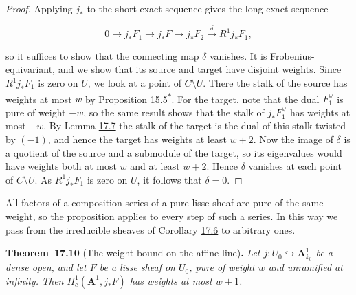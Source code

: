 \documentclass[11pt]{article}
\newenvironment{bpstatement}[2]{\par\addvspace{0.6\baselineskip}\noindent\textbf{#1}#2\textbf{.}\enspace\ignorespaces}
  {\par\addvspace{0.4\baselineskip}}
\newenvironment{bpstatementit}[2]{\begin{bpstatement}{#1}{#2}\itshape\ignorespaces}{\end{bpstatement}}
\newcommand{\bpout}[1]{#1\textsuperscript{\hyperlink{bp-outside}{\ensuremath{\ast}}}}
\begin{document}
\begin{proof}[{Proof}]\label{bp28}%
Applying \(j_*\) to the short exact sequence gives the long exact sequence

\[
0\to j_*F_1\to j_*F\to j_*F_2\xrightarrow{\ \delta\ }R^1j_*F_1,
\]

so it suffices to show that the connecting map \(\delta\) vanishes. It is Frobenius-equivariant, and we show that its source and target have disjoint weights. Since \(R^1j_*F_1\) is zero on \(U\), we look at a point of \(C\setminus U\). There the stalk of the source has weights at most \(w\) by Proposition \bpout{15.5}. For the target, note that the dual \(F_1^\vee\) is pure of weight \(-w\), so the same result shows that the stalk of \(j_*F_1^\vee\) has weights at most \(-w\). By Lemma \hyperref[bp23]{17.7} the stalk of the target is the dual of this stalk twisted by \((-1)\), and hence the target has weights at least \(w+2\). Now the image of \(\delta\) is a quotient of the source and a submodule of the target, so its eigenvalues would have weights both at most \(w\) and at least \(w+2\). Hence \(\delta\) vanishes at each point of \(C\setminus U\). As \(R^1j_*F_1\) is zero on \(U\), it follows that \(\delta=0\).
\end{proof}

\label{bp29}%
All factors of a composition series of a pure lisse sheaf are pure of the same weight, so the proposition applies to every step of such a series. In this way we pass from the irreducible sheaves of Corollary \hyperref[bp19]{17.6} to arbitrary ones.

\label{bp30}%
\begin{bpstatementit}{Theorem~17.10}{ (The weight bound on the affine line)}
Let \(j:U_0\hookrightarrow\mathbf A^1_{k_0}\) be a dense open, and let \(F\) be a lisse sheaf on \(U_0\), pure of weight \(w\) and unramified at infinity. Then \(H_c^1(\mathbf A^1,j_*F)\) has weights at most \(w+1\).
\end{bpstatementit}
\end{document}
